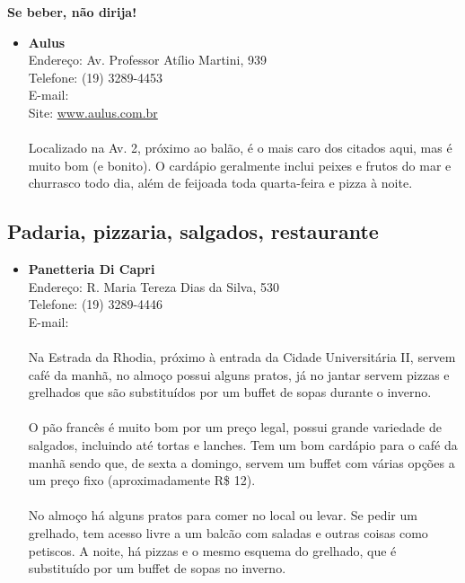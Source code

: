 \textbf{Se beber, não dirija!}

\begin{itemize}
\item \textbf{Aulus}
  \\Endereço: Av. Professor Atílio Martini, 939
  \\Telefone: (19) 3289-4453
  \\E-mail: 
  \\Site: \url{www.aulus.com.br}
  \\
  \\Localizado na Av. 2, próximo ao balão, é o mais caro dos citados aqui, mas
  é muito bom (e bonito). O cardápio geralmente inclui peixes e frutos do mar e
  churrasco todo dia, além de feijoada toda quarta-feira e pizza à noite.
\end{itemize}

\subsection{Padaria, pizzaria, salgados, restaurante}

\begin{itemize}
\item \textbf{Panetteria Di Capri}
  \\Endereço: R. Maria Tereza Dias da Silva, 530
  \\Telefone: (19) 3289-4446
  \\E-mail: 
  \\
  \\Na Estrada da Rhodia, próximo à entrada da Cidade Universitária II, servem
  café da manhã, no almoço possui alguns pratos, já no jantar servem pizzas e
  grelhados que são substituídos por um buffet de sopas durante o inverno.
  \\
  \\O pão francês é muito bom por um preço legal, possui grande variedade de
  salgados, incluindo até tortas e lanches. Tem um bom cardápio para o café da
  manhã sendo que, de sexta a domingo, servem um buffet com várias opções a um
  preço fixo (aproximadamente R\$ 12).
  \\
  \\No almoço há alguns pratos para comer no local ou levar. Se pedir um
  grelhado, tem acesso livre a um balcão com saladas e outras coisas como
  petiscos. A noite, há pizzas e o mesmo esquema do grelhado, que é substituído
  por um buffet de sopas no inverno.
\end{itemize}

